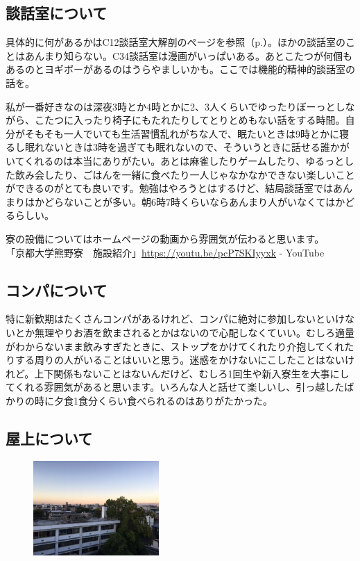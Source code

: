 \subsection{談話室について}
具体的に何があるかはC12談話室大解剖のページを参照（p.\pageref{daikaibo_danwa}）。ほかの談話室のことはあんまり知らない。C34談話室は漫画がいっぱいある。あとこたつが何個もあるのとヨギボーがあるのはうらやましいかも。ここでは機能的精神的談話室の話を。

私が一番好きなのは深夜3時とか4時とかに2、3人くらいでゆったりぼーっとしながら、こたつに入ったり椅子にもたれたりしてとりとめもない話をする時間。自分がそもそも一人でいても生活習慣乱れがちな人で、眠たいときは9時とかに寝るし眠れないときは3時を過ぎても眠れないので、そういうときに話せる誰かがいてくれるのは本当にありがたい。あとは麻雀したりゲームしたり、ゆるっとした飲み会したり、ごはんを一緒に食べたり一人じゃなかなかできない楽しいことができるのがとても良いです。勉強はやろうとはするけど、結局談話室ではあんまりはかどらないことが多い。朝6時7時くらいならあんまり人がいなくてはかどるらしい。

寮の設備についてはホームページの動画から雰囲気が伝わると思います。\\
「京都大学熊野寮　施設紹介」\url{https://youtu.be/pcP7SKIyyxk} - YouTube

\subsection{コンパについて}
特に新歓期はたくさんコンパがあるけれど、コンパに絶対に参加しないといけないとか無理やりお酒を飲まされるとかはないので心配しなくていい。むしろ適量がわからないまま飲みすぎたときに、ストップをかけてくれたり介抱してくれたりする周りの人がいることはいいと思う。迷惑をかけないにこしたことはないけれど。上下関係もないことはないんだけど、むしろ1回生や新入寮生を大事にしてくれる雰囲気があると思います。いろんな人と話せて楽しいし、引っ越したばかりの時に夕食1食分くらい食べられるのはありがたかった。

\subsection{屋上について}
\begin{figure}
  \centering
  \includegraphics[width=4.8cm]{gazo/okujo.jpg}
\end{figure}


